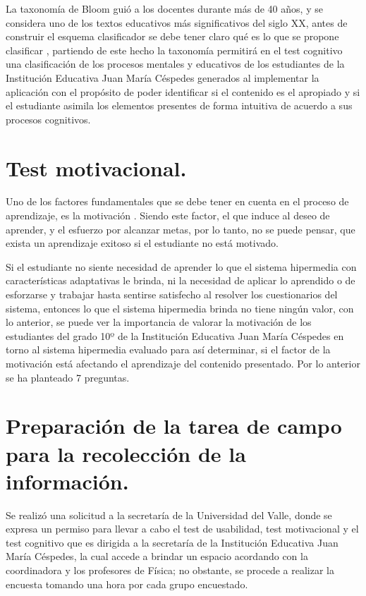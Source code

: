 La taxonomía de Bloom guió a los docentes durante más de 40 años, y se considera uno de los textos educativos más significativos del siglo XX, antes de construir el esquema clasificador se debe tener claro qué es lo que se propone clasificar \cite{Benjamin}, partiendo de este hecho la taxonomía permitirá en el test cognitivo una clasificación de los procesos mentales y educativos de los estudiantes de la Institución Educativa Juan María Céspedes generados al implementar la aplicación con el propósito de poder identificar si el contenido es el apropiado y si el estudiante asimila los elementos presentes de forma intuitiva de acuerdo a sus procesos cognitivos.

\section{Test motivacional.}

Uno de los factores fundamentales que se debe tener en cuenta en el proceso de aprendizaje, es la motivación \cite{TesisBarrientos}. Siendo este factor, el que induce al deseo de aprender, y el esfuerzo por alcanzar metas, por lo tanto, no se puede pensar, que exista un aprendizaje exitoso si el estudiante no está motivado.

Si el estudiante no siente necesidad de aprender lo que el sistema hipermedia con características adaptativas le brinda, ni la necesidad de aplicar lo aprendido o de esforzarse y trabajar hasta sentirse satisfecho al resolver los cuestionarios del sistema, entonces lo que el sistema hipermedia brinda no tiene ningún valor, con lo anterior, se puede ver la importancia de valorar la motivación de los estudiantes del grado 10º de la Institución Educativa Juan María Céspedes en torno al sistema hipermedia evaluado para así determinar, si el factor de la motivación está afectando el aprendizaje del contenido presentado. Por lo anterior se ha planteado 7 preguntas.

\section{Preparación de la tarea de campo para la recolección de la información.}

Se realizó una solicitud a la secretaría de la Universidad del Valle, donde se expresa un permiso para llevar a cabo el test de usabilidad, test motivacional y el test cognitivo que es dirigida a la secretaría de la Institución Educativa Juan María Céspedes, la cual accede a brindar un espacio acordando con la coordinadora y los profesores de Física; no obstante, se procede a realizar la encuesta tomando una hora por cada grupo encuestado.


